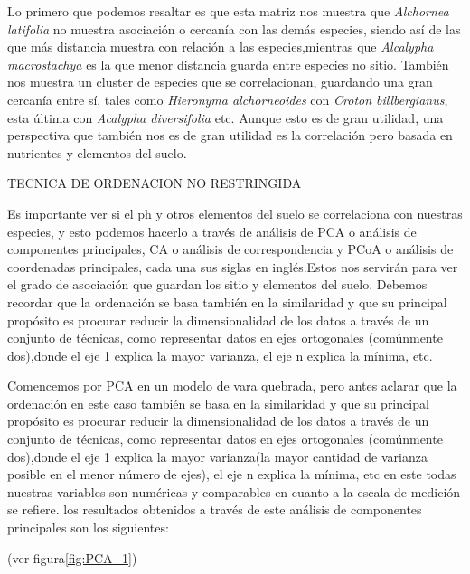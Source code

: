 \documentclass[11pt,]{article}
\begin{document}
Lo primero que podemos resaltar es que esta matriz nos muestra que
\emph{Alchornea latifolia} no muestra asociación o cercanía con las
demás especies, siendo así de las que más distancia muestra con relación
a las especies,mientras que \emph{Alcalypha macrostachya} es la que
menor distancia guarda entre especies no sitio. También nos muestra un
cluster de especies que se correlacionan, guardando una gran cercanía
entre sí, tales como \emph{Hieronyma alchorneoides} con \emph{Croton
billbergianus}, esta última con \emph{Acalypha diversifolia} etc. Aunque
esto es de gran utilidad, una perspectiva que también nos es de gran
utilidad es la correlación pero basada en nutrientes y elementos del
suelo.

TECNICA DE ORDENACION NO RESTRINGIDA

Es importante ver si el ph y otros elementos del suelo se correlaciona
con nuestras especies, y esto podemos hacerlo a través de análisis de
PCA o análisis de componentes principales, CA o análisis de
correspondencia y PCoA o análisis de coordenadas principales, cada una
sus siglas en inglés.Estos nos servirán para ver el grado de asociación
que guardan los sitio y elementos del suelo. Debemos recordar que la
ordenación se basa también en la similaridad y que su principal
propósito es procurar reducir la dimensionalidad de los datos a través
de un conjunto de técnicas, como representar datos en ejes ortogonales
(comúnmente dos),donde el eje 1 explica la mayor varianza, el eje n
explica la mínima, etc.

Comencemos por PCA en un modelo de vara quebrada, pero antes aclarar que
la ordenación en este caso también se basa en la similaridad y que su
principal propósito es procurar reducir la dimensionalidad de los datos
a través de un conjunto de técnicas, como representar datos en ejes
ortogonales (comúnmente dos),donde el eje 1 explica la mayor varianza(la
mayor cantidad de varianza posible en el menor número de ejes), el eje n
explica la mínima, etc en este todas nuestras variables son numéricas y
comparables en cuanto a la escala de medición se refiere. los resultados
obtenidos a través de este análisis de componentes principales son los
siguientes:

(ver figura\ref{fig:PCA_1})
\end{document}
